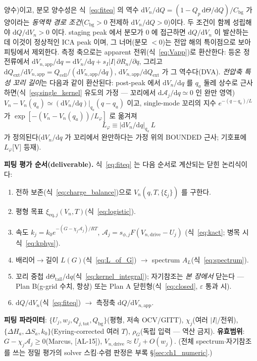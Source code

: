 \documentclass[11pt,a4paper]{article}
\newcommand{\dd}{\mathrm{d}}
\newcommand{\eq}{\mathrm{eq}}
\newcommand{\app}{\mathrm{app}}
\newcommand{\drive}{\mathrm{drive}}
\newcommand{\bg}{\mathrm{bg}}
\newcommand{\cell}{\mathrm{cell}}
\newcommand{\ext}{\mathrm{ext}}
\newcommand{\tot}{\mathrm{tot}}
\newcommand{\AL}[1]{\textsf{[AL-#1]}}
\begin{document}
양수)이고, 분모 양수성은 식~\eqref{eq:fiteq} 의 역수 $\dd V_n/\dd Q=(1-Q_p\,\dd\Theta/\dd Q)/C_\bg$ 가
양이라는 \emph{동역학 경로 조건}($C_\bg>0$ 전제하 $\dd V_n/\dd Q>0$)이다. 두 조건이 함께 성립해야
$\dd Q/\dd V_n>0$ 이다. staging peak 에서 분모가
$0$ 에 접근하면 $\dd Q/\dd V_n$ 이 발산하는데 이것이 정상적인 ICA peak 이며, 그 너머(분모 $<0$)는 전압 해의
특이점으로 보아 피팅에서 제외한다. 측정 축으로는
apparent 전위(식~\eqref{eq:Vapp})로 환산한다: 등온 정전류에서 $\dd V_{n,\app}/\dd q=\dd V_n/\dd q+
s_I|I|\,\partial R_n/\partial q$, 그리고 $\dd Q_\ext/\dd V_{n,\app}=Q_\cell/(\dd V_{n,\app}/\dd q)$,
$\dd V_{n,\app}/\dd Q_\ext$ 가 그 역수다(DVA). \emph{전압축 특성 꼬리 길이}는 다음과 같이 환산된다: post-peak 에서
$\dd V_n/\dd q$ 를 $q_a$ 둘레 상수로 근사하면(식~\eqref{eq:single_kernel} 유도의 가정 — 꼬리에서
$\dd\mathcal A_j/\dd q\simeq0$ 인 완만 영역) $V_n-V_n(q_a)\simeq(\dd V_n/\dd q)|_{q_a}(q-q_a)$ 이고,
single-mode 꼬리의 지수 $e^{-(q-q_a)/L}$ 가 $\exp[-(V_n-V_n(q_a))/L_\varphi]$ 로 옮겨져
\begin{equation}
L_\varphi\equiv\big|\dd V_n/\dd q\big|_{q_a}\,L
\label{eq:Lphi}
\end{equation}
가 정의된다($\dd V_n/\dd q$ 가 꼬리에서 완만하다는 가정 위의 BOUNDED 근사; 기호표에 $L_\varphi$[V] 등재).

\textbf{피팅 평가 순서(deliverable).} 식~\eqref{eq:fiteq} 는 다음 순서로 계산되는 닫힌 논리식이다:
\begin{enumerate}[label=\textbf{S\arabic*.},leftmargin=2.4em]
\item 전하 보존(식~\eqref{eq:charge_balance})으로 $V_n(q,T,\{\xi_j\})$ 를 구한다.
\item 평형 목표 $\xi_{\eq,j}(V_n,T)$(식~\eqref{eq:logistic}).
\item 속도 $k_j=k_0 e^{-(G-\chi_j\mathcal A_j)/RT}$, $\mathcal A_j=s_{\phi,j}F(V_{n,\drive}-U_j)$
  (식~\eqref{eq:kact}; 병목 시 식~\eqref{eq:kphys}).
\item 배리어$\to$길이 $L(G)$(식~\eqref{eq:L_of_G}) $\to$ spectrum $A_L$(식~\eqref{eq:spectrum}).
\item 꼬리 중첩 $\dd\Theta_\mathrm{tail}/\dd q$(식~\eqref{eq:kernel_integral}); 자기참조는 \emph{본 장에서} 닫는다 —
  Plan B(g-grid 수치, 항상) 또는 Plan A 닫힌형(식~\eqref{eq:closed}, $\varepsilon$ 통과 시).
\item $\dd Q/\dd V_n$(식~\eqref{eq:fiteq}) $\to$ 측정축 $\dd Q/\dd V_{n,\app}$.
\end{enumerate}
\textbf{피팅 파라미터}: $\{U_j,w_j,Q_{j,\tot},Q_\bg\}$(평형, 저속 OCV/GITT), $\chi_j$(여러 $|I|$/전위),
$\{\Delta H_a,\Delta S_a,k_0\}$(Eyring-corrected 여러 $T$), $\rho_G$(독립 입력 — 역산 금지). \textbf{유효범위}:
$G-\chi_j\mathcal A_j\ge0$(Marcus, \AL{15}), $V_{n,\drive}\approx U_j+O(w_j)$. (전체 spectrum$\cdot$자기참조를
쓰는 정밀 평가의 solver 스킴$\cdot$수렴 판정은 부록 \S\ref{sec:ch1_numeric}.)
\end{document}
